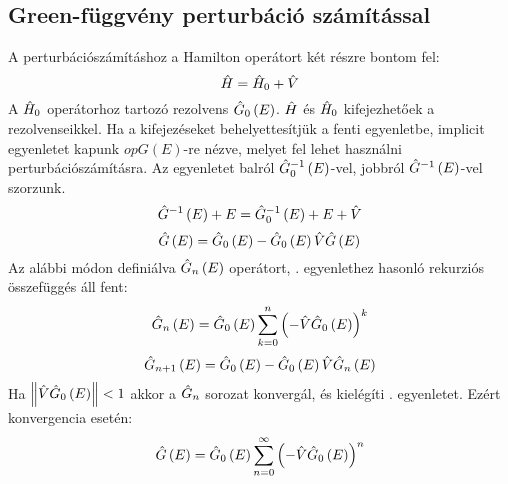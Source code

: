 \subsection{Green-függvény perturbáció számítással}
A perturbációszámításhoz a Hamilton operátort két részre bontom fel:
\begin{equation}
	\hat{H} = \hat{H}_0 + \hat{V}
\end{equation}
A $\hat{H}_0$ operátorhoz tartozó rezolvens $\hat{G}_0\left(E\right)$. $\hat{H}$ és $\hat{H}_0$ kifejezhetőek a rezolvenseikkel. Ha a kifejezéseket behelyettesítjük a fenti egyenletbe, implicit egyenletet kapunk $op{G}\left(E\right)$-re nézve, melyet fel lehet használni perturbációszámításra. Az egyenletet balról $\hat{G}_0^{-1}\left(E\right)$-vel, jobbról $\hat{G}^{-1}\left(E\right)$-vel szorzunk.
\begin{equation}
	\hat{G}^{-1}\left(E\right) + E = \hat{G}_0^{-1}\left(E\right) + E + \hat{V}
\end{equation}
\begin{equation}
	\hat{G}\left(E\right) = \hat{G}_0\left(E\right) - \hat{G}_0\left(E\right)\hat{V}\hat{G}\left(E\right)
	\label{green:pertmaster}
\end{equation}
Az alábbi módon definiálva $\hat{G}_n\left(E\right)$ operátort, . egyenlethez hasonló rekurziós összefüggés áll fent:
\begin{equation}
	\hat{G}_n\left(E\right) = \hat{G}_0\left(E\right)\sum_{k=0}^n\left(-\hat{V}\hat{G}_0\left(E\right)\right)^k
\end{equation}
\begin{equation}
	\hat{G}_{n+1}\left(E\right) = \hat{G}_0\left(E\right) - \hat{G}_0\left(E\right)\hat{V}\hat{G}_n\left(E\right)
\end{equation}
Ha $\left\lVert\hat{V}\hat{G}_0\left(E\right)\right\rVert < 1$ akkor a $\hat{G}_n$ sorozat konvergál, és kielégíti . egyenletet. Ezért konvergencia esetén:
\begin{equation}
	\hat{G}\left(E\right) = \hat{G}_0\left(E\right)\sum_{n=0}^\infty\left(-\hat{V}\hat{G}_0\left(E\right)\right)^n
\end{equation}




